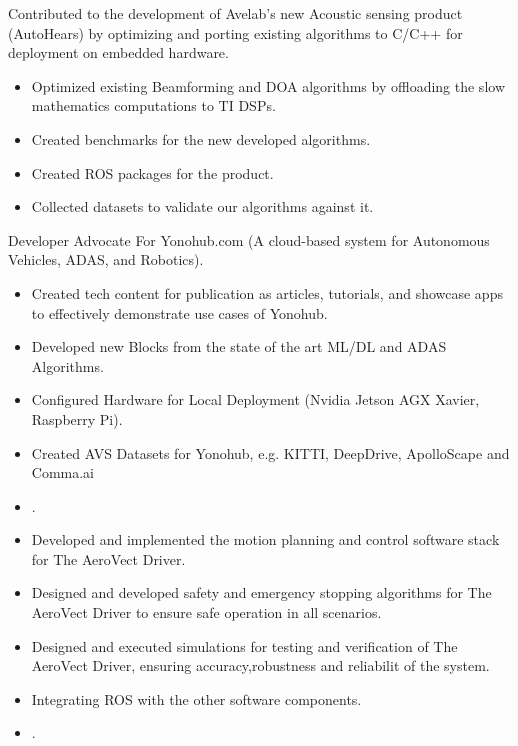 \documentclass[10pt,a4paper,ragged2e]{altacv}
\begin{document}
Contributed to the development of Avelab's new Acoustic sensing product (AutoHears) by optimizing and porting existing algorithms to C/C++ for deployment on embedded hardware. 
\begin{itemize}
\item Optimized existing Beamforming and DOA algorithms by offloading the slow mathematics computations to TI DSPs.
\item Created benchmarks for the new developed algorithms.
\item Created ROS packages for the product.
\item Collected datasets to validate our algorithms against it.
\end{itemize}
Developer Advocate For Yonohub.com (A cloud-based system for Autonomous Vehicles,
ADAS, and Robotics).
\begin{itemize}
\item  Created tech content for publication as articles, tutorials, and showcase apps to
effectively demonstrate use cases of Yonohub.
\item Developed new Blocks from the state of the art ML/DL and ADAS Algorithms.
\item Configured Hardware for Local Deployment (Nvidia Jetson AGX Xavier, Raspberry Pi).
\item Created AVS Datasets for Yonohub, e.g. KITTI, DeepDrive, ApolloScape and Comma.ai
	\item {}.
\end{itemize}
\divider
\divider
\divider

\divider



\begin{itemize}
\item Developed and implemented the motion planning and control software stack for The AeroVect Driver.
\item Designed and developed safety and emergency stopping algorithms for The AeroVect Driver to ensure safe operation in all scenarios. 
\item Designed and executed simulations for testing and verification of The AeroVect Driver, ensuring accuracy,robustness and reliabilit of the system.
\item Integrating ROS with the other software components.
	\item {}.

\end{itemize}
\end{document}
